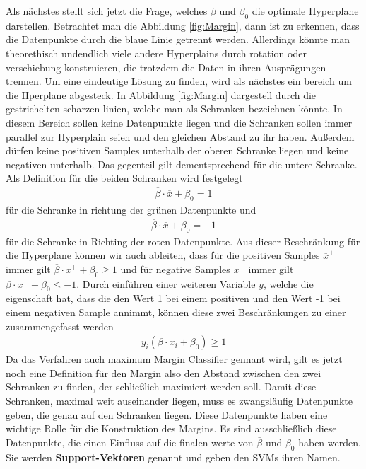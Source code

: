 \documentclass[
]{article}
\begin{document}
Als nächstes stellt sich jetzt die Frage, welches \(\overline{\beta}\)
und \(\beta_0\) die optimale Hyperplane darstellen. Betrachtet man die
Abbildung \ref{fig:Margin}, dann ist zu erkennen, dass die Datenpunkte
durch die blaue Linie getrennt werden. Allerdings könnte man
theorethisch undendlich viele andere Hyperplains durch rotation oder
verschiebung konstruieren, die trotzdem die Daten in ihren Ausprägungen
trennen. Um eine eindeutige Lösung zu finden, wird als nächstes ein
bereich um die Hperplane abgesteck. In Abbildung \ref{fig:Margin}
dargestell durch die gestrichelten scharzen linien, welche man als
Schranken bezeichnen könnte. In diesem Bereich sollen keine Datenpunkte
liegen und die Schranken sollen immer parallel zur Hyperplain seien und
den gleichen Abstand zu ihr haben. Außerdem dürfen keine positiven
Samples unterhalb der oberen Schranke liegen und keine negativen
unterhalb. Das gegenteil gilt dementsprechend für die untere Schranke.
Als Definition für die beiden Schranken wird festgelegt \begin{align}
\overline{\beta}\cdot \overline{x}+\beta_0=1\label{eq:posSV}
\end{align} für die Schranke in richtung der grünen Datenpunkte und
\begin{align}
\overline{\beta}\cdot \overline{x}+\beta_0=-1\label{eq:negSV}
\end{align} für die Schranke in Richting der roten Datenpunkte. Aus
dieser Beschränkung für die Hyperplane können wir auch ableiten, dass
für die positiven Samples \(\overline{x}^+\) immer gilt
\(\overline{\beta}\cdot \overline{x}^++\beta_0\ge 1\) und für negative
Samples \(\overline{x}^-\) immer gilt
\(\overline{\beta}\cdot \overline{x}^-+\beta_0\le -1\). Durch einführen
einer weiteren Variable \(y\), welche die eigenschaft hat, dass die den
Wert 1 bei einem positiven und den Wert -1 bei einem negativen Sample
annimmt, können diese zwei Beschränkungen zu einer zusammengefasst
werden \begin{align}
y_i(\overline{\beta}\cdot \overline{x}_i+\beta_0)\ge 1\label{eq:Nebenbedingung}
\end{align} Da das Verfahren auch maximum Margin Classifier gennant
wird, gilt es jetzt noch eine Definition für den Margin also den Abstand
zwischen den zwei Schranken zu finden, der schließlich maximiert werden
soll. Damit diese Schranken, maximal weit auseinander liegen, muss es
zwangsläufig Datenpunkte geben, die genau auf den Schranken liegen.
Diese Datenpunkte haben eine wichtige Rolle für die Konstruktion des
Margins. Es sind ausschließlich diese Datenpunkte, die einen Einfluss
auf die finalen werte von \(\overline{\beta}\) und \(\beta_0\) haben
werden. Sie werden \textbf{Support-Vektoren} genannt und geben den SVMs
ihren Namen.
\end{document}

